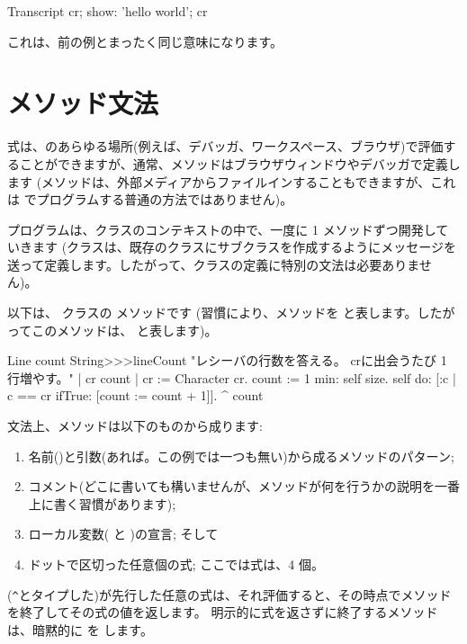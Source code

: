 \documentclass[a4paper,10pt,twoside]{book}
\begin{document}
\begin{code}{}
Transcript cr;
    show: 'hello world';
    cr
\end{code}
これは、前の例とまったく同じ意味になります。

\section{メソッド文法}

式は、\pharo のあらゆる場所(例えば、デバッガ、ワークスペース、ブラウザ)で評価することができますが、通常、メソッドはブラウザウィンドウやデバッガで定義します
(メソッドは、外部メディアからファイルインすることもできますが、これは \pharo でプログラムする普通の方法ではありません)。

プログラムは、クラスのコンテキストの中で、一度に 1 メソッドずつ開発していきます
(クラスは、既存のクラスにサブクラスを作成するようにメッセージを送って定義します。したがって、クラスの定義に特別の文法は必要ありません)。

以下は、 クラスの  メソッドです
(習慣により、メソッドを  と表します。したがってこのメソッドは、 と表します)。

\begin{method}[lineCount]{Line count}
String>>>lineCount
   "レシーバの行数を答える。
   crに出会うたび 1 行増やす。"
   | cr count |
   cr := Character cr.
   count := 1 min: self size.
   self do:
      [:c | c == cr ifTrue: [count := count + 1]].
   ^ count
\end{method}

文法上、メソッドは以下のものから成ります:
\begin{enumerate}
  \item 名前(\ie {})と引数(あれば。この例では一つも無い)から成るメソッドのパターン;
  \item コメント(どこに書いても構いませんが、メソッドが何を行うかの説明を一番上に書く習慣があります);
  \item ローカル変数(\ie {} と )の宣言; そして
  \item ドットで区切った任意個の式; ここでは式は、4 個。
\end{enumerate}

\ct{^}(\verb|^|とタイプした)が先行した任意の式は、それ評価すると、その時点でメソッドを終了してその式の値を返します。
明示的に式を返さずに終了するメソッドは、暗黙的に  を します。
\end{document}
